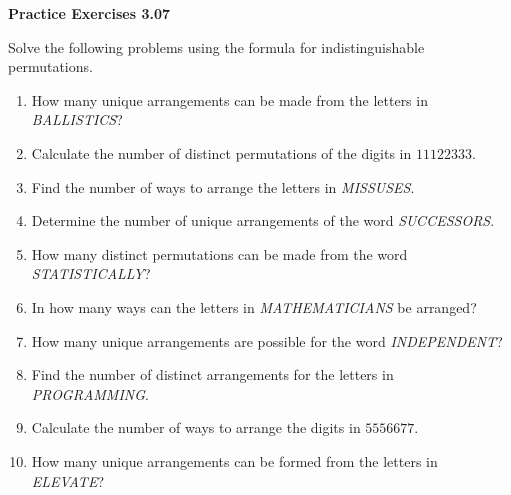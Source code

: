 \vspace{0.3ex}
\noindent\textbf{Practice Exercises 3.07}

\vspace{0.2ex}

Solve the following problems using the formula for indistinguishable permutations.

\begin{enumerate}[label=\color{blue}\arabic*.]
    \item How many unique arrangements can be made from the letters in \textit{BALLISTICS}?
    \item Calculate the number of distinct permutations of the digits in \(11122333\).
    \item Find the number of ways to arrange the letters in \textit{MISSUSES}.
    \item Determine the number of unique arrangements of the word \textit{SUCCESSORS}.
    \item How many distinct permutations can be made from the word \textit{STATISTICALLY}?
    \item In how many ways can the letters in \textit{MATHEMATICIANS} be arranged?
    \item How many unique arrangements are possible for the word \textit{INDEPENDENT}?
    \item Find the number of distinct arrangements for the letters in \textit{PROGRAMMING}.
    \item Calculate the number of ways to arrange the digits in \(5556677\).
    \item How many unique arrangements can be formed from the letters in \textit{ELEVATE}?
\end{enumerate}
